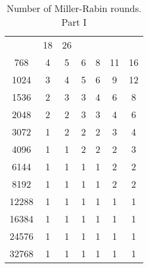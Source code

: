 \documentclass[synpaper]{book}
\begin{document}
\begin{table}[h]
\begin{center}
\begin{tabular}{c c c c c c c}
                    & 18                  & 26                                             \\
      768           & 4                   & 5                   & 6                   & 8
                    & 11                  & 16                                             \\
      1024          & 3                   & 4                   & 5                   & 6
                    & 9                   & 12                                             \\
      1536          & 2                   & 3                   & 3                   & 4
                    & 6                   & 8                                              \\
      2048          & 2                   & 2                   & 3                   & 3
                    & 4                   & 6                                              \\
      3072          & 1                   & 2                   & 2                   & 2
                    & 3                   & 4                                              \\
      4096          & 1                   & 1                   & 2                   & 2
                    & 2                   & 3                                              \\
      6144          & 1                   & 1                   & 1                   & 1
                    & 2                   & 2                                              \\
      8192          & 1                   & 1                   & 1                   & 1
                    & 2                   & 2                                              \\
      12288         & 1                   & 1                   & 1                   & 1
                    & 1                   & 1                                              \\
      16384         & 1                   & 1                   & 1                   & 1
                    & 1                   & 1                                              \\
      24576         & 1                   & 1                   & 1                   & 1
                    & 1                   & 1                                              \\
      32768         & 1                   & 1                   & 1                   & 1
                    & 1                   & 1
    \end{tabular}
    \caption{ Number of Miller-Rabin rounds. Part I } \label{table:millerrabinrunsp1}
  \end{center}
\end{table}
\end{document}
